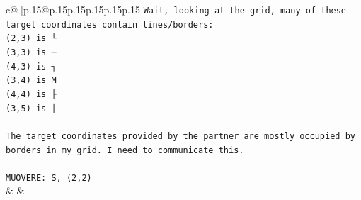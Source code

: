 \documentclass{article}
\begin{document}
{\begin{supertabular}{c@{$\;$}|p{.15\linewidth}@{}p{.15\linewidth}p{.15\linewidth}p{.15\linewidth}p{.15\linewidth}p{.15\linewidth}}
{{{\texttt{Wait, looking at the grid, many of these target coordinates contain lines/borders:} \\
\texttt{(2,3) is └} \\
\texttt{(3,3) is ─} \\
\texttt{(4,3) is ┐} \\
\texttt{(3,4) is M} \\
\texttt{(4,4) is ├} \\
\texttt{(3,5) is │} \\
\\ 
\texttt{The target coordinates provided by the partner are mostly occupied by borders in my grid. I need to communicate this.} \\
\\ 
\texttt{MUOVERE: S, (2,2)} \\
            }
        }
    }
    & & \\ \\


\end{supertabular}}
\end{document}
